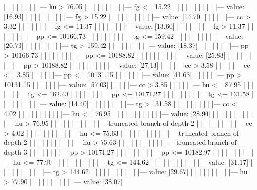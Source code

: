 \documentclass[UTF8, a4paper]{ctexart}
\begin{document}
|   |   |   |   |   |   |   |   |--- hu >  76.05
|   |   |   |   |   |   |   |   |   |--- fg <= 15.22
|   |   |   |   |   |   |   |   |   |   |--- value: [16.93]
|   |   |   |   |   |   |   |   |   |--- fg >  15.22
|   |   |   |   |   |   |   |   |   |   |--- value: [14.70]
|   |   |   |   |   |--- cc >  3.32
|   |   |   |   |   |   |--- fg <= 11.37
|   |   |   |   |   |   |   |--- value: [13.60]
|   |   |   |   |   |   |--- fg >  11.37
|   |   |   |   |   |   |   |--- pp <= 10166.73
|   |   |   |   |   |   |   |   |--- tg <= 159.42
|   |   |   |   |   |   |   |   |   |--- value: [20.73]
|   |   |   |   |   |   |   |   |--- tg >  159.42
|   |   |   |   |   |   |   |   |   |--- value: [18.37]
|   |   |   |   |   |   |   |--- pp >  10166.73
|   |   |   |   |   |   |   |   |--- pp <= 10188.82
|   |   |   |   |   |   |   |   |   |--- value: [25.83]
|   |   |   |   |   |   |   |   |--- pp >  10188.82
|   |   |   |   |   |   |   |   |   |--- value: [27.13]
|   |   |   |--- cc >  3.58
|   |   |   |   |--- cc <= 3.85
|   |   |   |   |   |--- pp <= 10131.15
|   |   |   |   |   |   |--- value: [41.63]
|   |   |   |   |   |--- pp >  10131.15
|   |   |   |   |   |   |--- value: [57.03]
|   |   |   |   |--- cc >  3.85
|   |   |   |   |   |--- hu <= 87.95
|   |   |   |   |   |   |--- tg <= 162.43
|   |   |   |   |   |   |   |--- pp <= 10171.27
|   |   |   |   |   |   |   |   |--- tg <= 131.58
|   |   |   |   |   |   |   |   |   |--- value: [14.40]
|   |   |   |   |   |   |   |   |--- tg >  131.58
|   |   |   |   |   |   |   |   |   |--- cc <= 4.02
|   |   |   |   |   |   |   |   |   |   |--- hu <= 76.95
|   |   |   |   |   |   |   |   |   |   |   |--- value: [28.90]
|   |   |   |   |   |   |   |   |   |   |--- hu >  76.95
|   |   |   |   |   |   |   |   |   |   |   |--- truncated branch of depth 2
|   |   |   |   |   |   |   |   |   |--- cc >  4.02
|   |   |   |   |   |   |   |   |   |   |--- hu <= 75.63
|   |   |   |   |   |   |   |   |   |   |   |--- truncated branch of depth 2
|   |   |   |   |   |   |   |   |   |   |--- hu >  75.63
|   |   |   |   |   |   |   |   |   |   |   |--- truncated branch of depth 3
|   |   |   |   |   |   |   |--- pp >  10171.27
|   |   |   |   |   |   |   |   |--- pp <= 10182.97
|   |   |   |   |   |   |   |   |   |--- hu <= 77.90
|   |   |   |   |   |   |   |   |   |   |--- tg <= 144.62
|   |   |   |   |   |   |   |   |   |   |   |--- value: [31.17]
|   |   |   |   |   |   |   |   |   |   |--- tg >  144.62
|   |   |   |   |   |   |   |   |   |   |   |--- value: [29.67]
|   |   |   |   |   |   |   |   |   |--- hu >  77.90
|   |   |   |   |   |   |   |   |   |   |--- value: [38.07]
\end{document}
